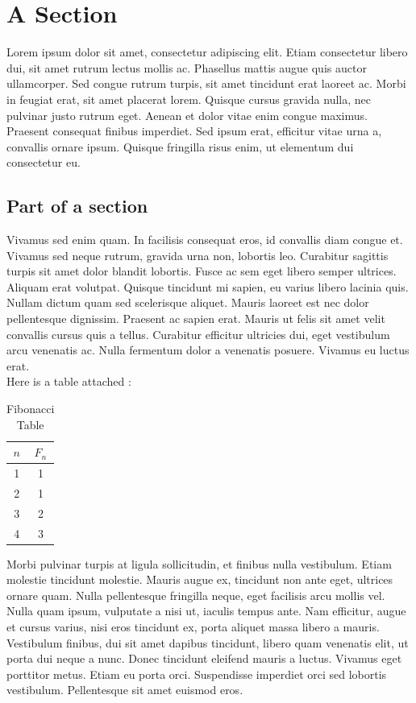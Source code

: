 \section{A Section}

Lorem ipsum\cite{loremipsum} dolor sit amet, consectetur adipiscing elit. Etiam consectetur libero dui, sit amet rutrum lectus mollis ac. Phasellus mattis augue quis auctor ullamcorper. Sed congue rutrum turpis, sit amet tincidunt erat laoreet ac. Morbi in feugiat erat, sit amet placerat lorem. Quisque cursus gravida nulla, nec pulvinar justo rutrum eget. Aenean et dolor vitae enim congue maximus. Praesent consequat finibus imperdiet. Sed ipsum erat, efficitur vitae urna a, convallis ornare ipsum. Quisque fringilla risus enim, ut elementum dui consectetur eu.

\subsection{Part of a section}

Vivamus sed enim quam. In facilisis consequat eros, id convallis diam congue et. Vivamus sed neque rutrum, gravida urna non, lobortis leo. Curabitur sagittis turpis sit amet dolor blandit lobortis. Fusce ac sem eget libero semper ultrices. Aliquam erat volutpat. Quisque tincidunt mi sapien, eu varius libero lacinia quis. Nullam dictum quam sed scelerisque aliquet. Mauris laoreet est nec dolor pellentesque dignissim. Praesent ac sapien erat. Mauris ut felis sit amet velit convallis cursus quis a tellus. Curabitur efficitur ultricies dui, eget vestibulum arcu venenatis ac. Nulla fermentum dolor a venenatis posuere. Vivamus eu luctus erat.\\

Here is a table attached :
\begin{table}[H]
    \centering
        \begin{tabular}{|c|c|}
        \hline
        $n$ & $F_n$\\
        \hline
        1 & 1 \\
        \hline
        2 & 1 \\
        \hline
        3 & 2 \\
        \hline
        4 & 3 \\
        \hline
        \end{tabular}
    \caption{Fibonacci Table}
\end{table}

Morbi pulvinar turpis at  ligula sollicitudin, et finibus nulla vestibulum. Etiam molestie tincidunt molestie. Mauris augue ex, tincidunt non ante eget, ultrices ornare quam. Nulla pellentesque fringilla neque, eget facilisis arcu mollis vel. Nulla quam ipsum, vulputate a nisi ut, iaculis tempus ante. Nam efficitur, augue et cursus varius, nisi eros tincidunt ex, porta aliquet massa libero a mauris. Vestibulum finibus, dui sit amet dapibus tincidunt, libero quam venenatis elit, ut porta dui neque a nunc. Donec tincidunt eleifend mauris a luctus. Vivamus eget porttitor metus. Etiam eu porta orci. Suspendisse imperdiet orci sed lobortis vestibulum. Pellentesque sit amet euismod eros.\\


